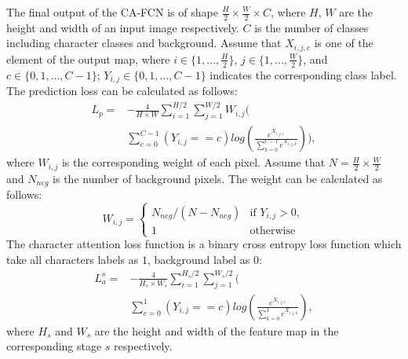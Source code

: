 \documentclass[letterpaper]{article} \usepackage{aaai19}  \usepackage{times}  \usepackage{helvet}  \usepackage{courier}  \usepackage{url}  \usepackage{graphicx}  \frenchspacing  \usepackage{multirow}
\begin{document}
The final output of the CA-FCN is of shape $\frac{H}{2} \times \frac{W}{2} \times C$, where $H$, $W$ are the height and width of an input image respectively. $C$ is the number of classes including character classes and background. Assume that $X_{i,j,c}$ is one of the element of the output map, where $i \in \{1, ..., \frac{H}{2}\}$, $j \in \{1, ..., \frac{W}{2}\}$, and $c \in \{0,1, ..., C-1\}$; $Y_{i,j} \in \{0,1, ..., C-1\}$ indicates the corresponding class label. The prediction loss can be calculated as follows:
\begin{equation}
\begin{aligned}
L_p = & -\frac{4}{H \times W}\sum_{i=1}^{H/2}\sum_{j=1}^{W/2}W_{i,j}(\\
& \sum_{c=0}^{C-1} 
(Y_{i,j}==c) log(\frac{e^{X_{i,j,c}}}{\sum_{k=0}^{C-1} e^{X_{i,j,k}}})),
\end{aligned}
\end{equation}
where $W_{i,j}$ is the corresponding weight of each pixel. Assume that $N=\frac{H}{2} \times \frac{W}{2}$ and $N_{neg}$ is the number of background pixels. The weight can be calculated as follows:
\begin{equation}
W_{i,j} = 
  \begin{cases}
    N_{neg} / (N - N_{neg})& \text{if } Y_{i,j}>0, \\
    1& \text{otherwise}
  \end{cases}
\end{equation}
The character attention loss function is a binary cross entropy loss function which take all characters labels as $1$, background label as $0$:
\begin{equation}
\begin{aligned}
L_a^s = & -\frac{4}{H_s \times W_s}\sum_{i=1}^{H_s/2}\sum_{j=1}^{W_s/2}(\\
& \sum_{c=0}^{1} (Y_{i,j}==c) log(\frac{e^{X_{i,j,c}}}{\sum_{k=0}^{1} e^{X_{i,j,k}}}),
\end{aligned}
\end{equation}
where $H_s$ and $W_s$ are the height and width of the feature map in the corresponding stage $s$ respectively.
\end{document}
